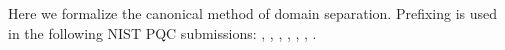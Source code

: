 %		
%	
%	



Here we formalize the canonical method of domain separation.
Prefixing is used in the following NIST PQC submissions: , , , , , ,  .

